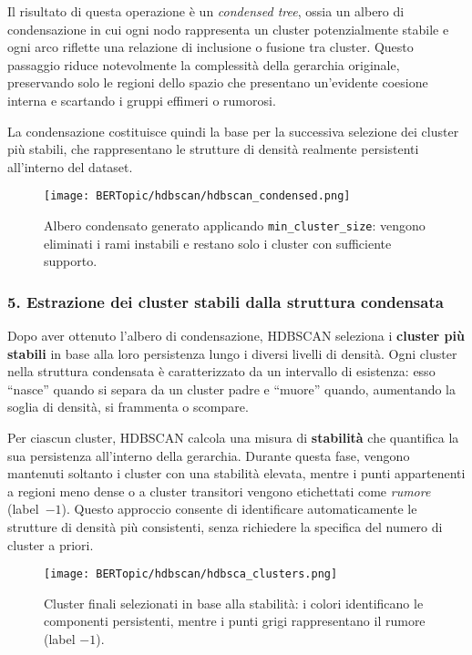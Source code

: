 Il risultato di questa operazione è un \textit{condensed tree}, ossia un albero di condensazione in cui ogni nodo rappresenta un cluster potenzialmente stabile e ogni arco riflette una relazione di inclusione o fusione tra cluster. 
Questo passaggio riduce notevolmente la complessità della gerarchia originale, preservando solo le regioni dello spazio che presentano un'evidente coesione interna e scartando i gruppi effimeri o rumorosi.

La condensazione costituisce quindi la base per la successiva selezione dei cluster più stabili, che rappresentano le strutture di densità realmente persistenti all'interno del dataset.

\begin{figure}[H]
\centering
\texttt{[image: BERTopic/hdbscan/hdbscan\_condensed.png]}
\caption{Albero condensato generato applicando \texttt{min\_cluster\_size}: vengono eliminati i rami instabili e restano solo i cluster con sufficiente supporto.}
\label{fig:hdbscan-condensed}
\end{figure}

\subsubsection*{5. Estrazione dei cluster stabili dalla struttura condensata}

Dopo aver ottenuto l'albero di condensazione, HDBSCAN seleziona i \textbf{cluster più stabili} in base alla loro persistenza lungo i diversi livelli di densità. 
Ogni cluster nella struttura condensata è caratterizzato da un intervallo di esistenza: esso ``nasce'' quando si separa da un cluster padre e ``muore'' quando, aumentando la soglia di densità, si frammenta o scompare.

Per ciascun cluster, HDBSCAN calcola una misura di \textbf{stabilità} che quantifica la sua persistenza all'interno della gerarchia. 
Durante questa fase, vengono mantenuti soltanto i cluster con una stabilità elevata, mentre i punti appartenenti a regioni meno dense o a cluster transitori vengono etichettati come \textit{rumore} (label~$-1$). 
Questo approccio consente di identificare automaticamente le strutture di densità più consistenti, senza richiedere la specifica del numero di cluster a priori.

\begin{figure}[H]
\centering
\texttt{[image: BERTopic/hdbscan/hdbsca\_clusters.png]}
\caption{Cluster finali selezionati in base alla stabilità: i colori identificano le componenti persistenti, mentre i punti grigi rappresentano il rumore (label $-1$).}
\label{fig:hdbscan-final-clusters}
\end{figure}


